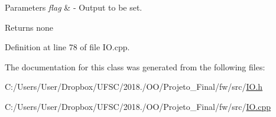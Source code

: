 \begin{DoxyParams}{Parameters}
{\em flag} & -\/ Output to be set. \\
\hline
\end{DoxyParams}
\begin{DoxyReturn}{Returns}
none 
\end{DoxyReturn}


Definition at line 78 of file I\+O.\+cpp.



The documentation for this class was generated from the following files\+:\begin{DoxyCompactItemize}
\item 
C\+:/\+Users/\+User/\+Dropbox/\+U\+F\+S\+C/2018./\+O\+O/\+Projeto\+\_\+\+Final/fw/src/\mbox{\hyperlink{_i_o_8h}{I\+O.\+h}}\item 
C\+:/\+Users/\+User/\+Dropbox/\+U\+F\+S\+C/2018./\+O\+O/\+Projeto\+\_\+\+Final/fw/src/\mbox{\hyperlink{_i_o_8cpp}{I\+O.\+cpp}}\end{DoxyCompactItemize}
